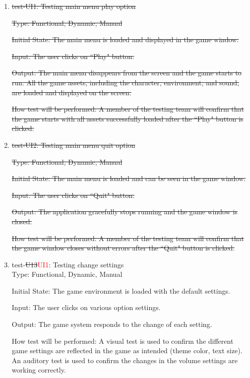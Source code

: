 \documentclass[12pt, titlepage]{article}
\begin{document}
\begin{enumerate}

\item{\sout{test-UI1: Testing main menu play option\\}}

\sout{Type: Functional, Dynamic, Manual}
					
\sout{Initial State: The main menu is loaded and displayed in the game window.}
					
\sout{Input: The user clicks on ``Play" button.}
					
\sout{Output: The main menu disappears from the screen and the game starts to run. All the game assets, including the character, environment, and sound, are loaded and displayed on the screen.}
					
\sout{How test will be performed: A member of the testing team will confirm that the game starts with all assets successfully loaded after the ``Play" button is clicked.}

\item{\sout{test-UI2: Testing main menu quit option}\\}

\sout{Type: Functional, Dynamic, Manual}
					
\sout{Initial State: The main menu is loaded and can be seen in the game window.}
					
\sout{Input: The user clicks on ``Quit" button.}
					
\sout{Output: The application gracefully stops running and the game window is closed.}
					
\sout{How test will be performed: A member of the testing team will confirm that the game window closes without errors after the ``Quit" button is clicked.}

\item{test-\sout{U13}\textcolor{red}{UI1}: Testing change settings\\}
Type: Functional, Dynamic, Manual
					
Initial State: The game environment is loaded with the default settings.
					
Input: The user clicks on various option settings.
					
Output: The game system responds to the change of each setting.
					
How test will be performed: A visual test is used to confirm the different game settings are reflected in the game as intended (theme color, text size). An auditory test is used to confirm the changes in the volume settings are working correctly. 


\end{enumerate}
\end{document}
